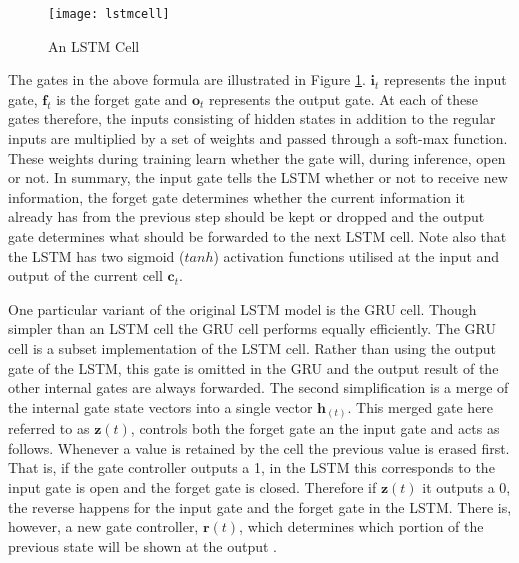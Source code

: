 \begin{figure}
\centering
  \texttt{[image: lstmcell]}\\
  \caption{An LSTM Cell  \citep{graves2013hybrid}}\label{fig_3_3_lstmcell}
\end{figure}

The gates in the above formula are illustrated in Figure \ref{fig_3_3_lstmcell}.  $\mathbf{i}_t$ represents the input gate, $\mathbf{f}_t$ is the forget gate and $\mathbf{o}_t$ represents the output gate.  At each of these gates therefore, the inputs consisting of hidden states in addition to the regular inputs are multiplied by a set of weights and passed through a soft-max function. These weights during training learn whether the gate will, during inference, open or not.  In summary, the input gate tells the LSTM whether or not to receive new information, the forget gate determines whether the current information it already has from the previous step should be kept or dropped and the output gate determines what should be forwarded to the next LSTM cell.  Note also that the LSTM has two sigmoid ($tanh$) activation functions utilised at the input and output of the current cell $\mathbf{c}_t$.

One particular variant of the original LSTM model is the GRU cell. Though simpler than an LSTM cell the GRU cell performs equally efficiently.   The GRU cell is a subset implementation of the LSTM cell.  Rather than using the output gate of the LSTM, this gate is omitted in the GRU and the output result of the other internal gates are always forwarded.  The second simplification is a merge of the internal gate state vectors into a single vector $\mathbf{h}_{(t)}$.  This merged gate here referred to as $\mathbf{z}(t)$, controls both the forget gate an the input gate and acts as follows. Whenever a value is retained by the cell the previous value is erased first.  That is, if the gate controller outputs a 1, in the LSTM this corresponds to the input gate is open and the forget gate is closed. Therefore if $\mathbf{z}(t)$ it outputs a 0, the reverse happens for the input gate and the forget gate in the LSTM.  There is, however, a new gate controller, $\mathbf{r}(t)$, which determines which portion of the previous state will be shown at the output \citep{cho2014learning}.

